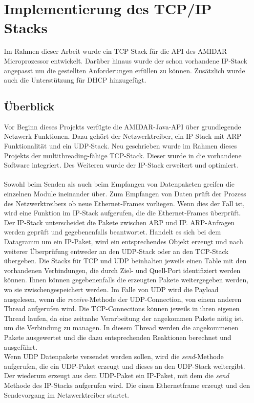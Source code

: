 \chapter{Implementierung des TCP/IP Stacks}
Im Rahmen dieser Arbeit wurde ein TCP Stack für die API des AMIDAR Microprozessor entwickelt. Darüber hinaus wurde der schon vorhandene IP-Stack angepasst um die gestellten Anforderungen erfüllen zu können. Zusätzlich wurde auch die Unterstützung für DHCP hinzugefügt.

\section{Überblick}
Vor Beginn dieses Projekts verfügte die AMIDAR-Java-API über grundlegende Netzwerk Funktionen. Dazu gehört der Netzwerktreiber, ein IP-Stack mit ARP-Funktionalität und ein UDP-Stack. Neu geschrieben wurde im Rahmen dieses Projekts der multithreading-fähige TCP-Stack. Dieser wurde in die vorhandene Software integriert. Des Weiteren wurde der IP-Stack erweitert und optimiert.\\\\
Sowohl beim Senden als auch beim Empfangen von Datenpaketen greifen die einzelnen Module ineinander über. Zum Empfangen von Daten prüft der Prozess des Netzwerktreibers ob neue Ethernet-Frames vorliegen. Wenn dies der Fall ist, wird eine Funktion im IP-Stack aufgerufen, die die Ethernet-Frames überprüft. Der IP-Stack unterscheidet die Pakete zwischen ARP und IP. ARP-Anfragen werden geprüft und gegebenenfalls beantwortet. Handelt es sich bei dem Datagramm um ein IP-Paket, wird ein entsprechendes Objekt erzeugt und nach weiterer Überprüfung entweder an den UDP-Stack oder an den TCP-Stack übergeben. Die Stacks für TCP und UDP beinhalten jeweils einen Table mit den vorhandenen Verbindungen, die durch Ziel- und Quell-Port identifiziert werden können. Ihnen können gegebenenfalls die erzeugten Pakete weitergegeben werden, wo sie zwischengespeichert werden. Im Falle von UDP wird die Payload ausgelesen, wenn die \textit{receive}-Methode der UDP-Connection, von einem anderen Thread aufgerufen wird. Die TCP-Connections können jeweils in ihren eigenen Thread laufen, da eine zeitnahe Verarbeitung der angekommen Pakete nötig ist, um die Verbindung zu managen. In diesem Thread werden die angekommenen Pakete ausgewertet und die dazu entsprechenden Reaktionen berechnet und ausgeführt. \\
Wenn UDP Datenpakete versendet werden sollen, wird die \textit{send}-Methode aufgerufen, die ein UDP-Paket erzeugt und dieses an den UDP-Stack weitergibt. Der wiederum erzeugt aus dem UDP-Paket ein IP-Paket, mit dem die \textit{send} Methode des IP-Stacks aufgerufen wird. Die einen Ethernetframe erzeugt und den Sendevorgang im Netzwerktreiber startet.\\ \\
